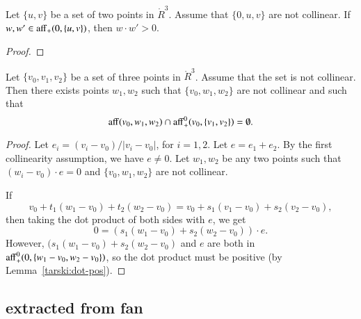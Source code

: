 \begin{tarskidata}
\begin{tarski}
\begin{lemma}
Let $\{u,v\}$ be a set of two points in $\ring{R}^3$.
Assume that $\{0,u,v\}$ are not collinear.
If $w,w'\in{\operatorname{aff}}_+(0,\{u,v\})$, then
$w\cdot w' > 0$.
\end{lemma}

\begin{proof}
\end{proof}
\end{tarski}



\begin{tarski}

\begin{lemma}
Let $\{v_0,v_1,v_2\}$ be a set of three points in $\ring{R}^3$.
Assume that the set is not collinear.  Then there exists points
$w_1,w_2$ such that $\{v_0,w_1,w_2\}$ are not collinear and such
that 
   $$
   {\operatorname{aff}}(v_0,w_1,w_2)\cap {\operatorname{aff}}_+^0(v_0,\{v_1,v_2\})=\emptyset .
   $$
\end{lemma}

\begin{proof}
Let $e_i = (v_i-v_0)/|v_i-v_0|$, for $i=1,2$. Let 
$e = e_1+e_2$.  By the first collinearity assumption, we have
$e\ne 0$.  Let $w_1,w_2$ be any two points such that
$(w_i-v_0)\cdot e = 0$ and $\{v_0,w_1,w_2\}$ are not collinear.

If 
 $$
 v_0 + t_1 (w_1-v_0) + t_2 (w_2-v_0)=v_0 + s_1 (v_1-v_0) + s_2 (v_2-v_0),
 $$
then taking the dot product of both sides with $e$, we get
$$
  0 = (s_1 (w_1-v_0) + s_2 (w_2-v_0))\cdot e.
$$
However, $(s_1 (w_1-v_0) + s_2 (w_2-v_0)$ and $e$ are both
in ${\operatorname{aff}}_+^0(0,\{w_1-v_0,w_2-v_0\})$, so the dot product
must be positive (by Lemma~\ref{tarski:dot-pos}).
\end{proof}
\end{tarski}






\begin{tarski}
\subsection{extracted from fan}


\end{tarski}
\end{tarskidata}
